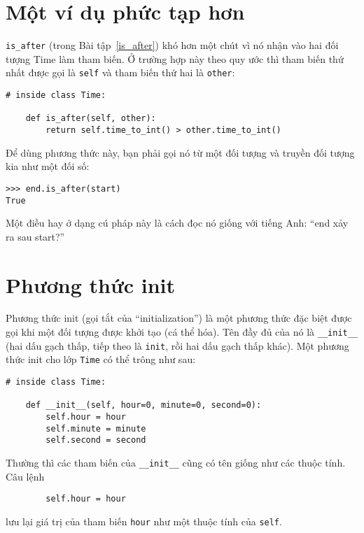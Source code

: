 \documentclass[11pt]{book}
\begin{document}
\section{Một ví dụ phức tạp hơn}

\verb"is_after" (trong Bài tập~\ref{is_after}) khó hơn một chút vì
nó nhận vào hai đối tượng Time làm tham biến. Ở trường hợp này
theo quy ước thì tham biến thứ nhất được gọi là {\tt self} và tham biến
thứ hai là {\tt other}:


\beforeverb
\begin{verbatim}
# inside class Time:

    def is_after(self, other):
        return self.time_to_int() > other.time_to_int()
\end{verbatim}
\afterverb
%
Để dùng phương thức này, bạn phải gọi nó từ một đối tượng và
truyền đối tượng kia như một đối số:

\beforeverb
\begin{verbatim}
>>> end.is_after(start)
True
\end{verbatim}
\afterverb
%
Một điều hay ở dạng cú pháp này là cách đọc nó giống với
tiếng Anh: ``end xảy ra sau start?''


\section{Phương thức init}


Phương thức init (gọi tắt của ``initialization'') là một phương thức
đặc biệt được gọi khi một đối tượng được khởi tạo (cá thể hóa).
Tên đầy đủ của nó là \verb"__init__" (hai dấu gạch thấp,
tiếp theo là {\tt init}, rồi hai dấu gạch thấp khác). Một phương thức
init cho lớp {\tt Time} có thể trông như sau:

\beforeverb
\begin{verbatim}
# inside class Time:

    def __init__(self, hour=0, minute=0, second=0):
        self.hour = hour
        self.minute = minute
        self.second = second
\end{verbatim}
\afterverb
%
Thường thì các tham biến của  \verb"__init__" cũng có
tên giống như các thuộc tính. Câu lệnh

\beforeverb
\begin{verbatim}
        self.hour = hour
\end{verbatim}
\afterverb
%
lưu lại giá trị của tham biến {\tt hour} như một thuộc tính
của {\tt self}.
\end{document}
